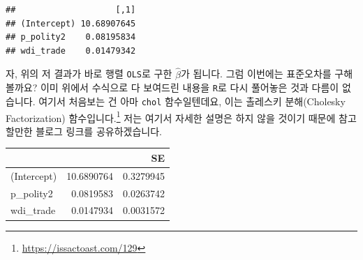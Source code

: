 \documentclass[
]{book}
\newenvironment{Shaded}{\begin{snugshade}}{\end{snugshade}}
\newcommand{\CommentTok}[1]{\textcolor[rgb]{0.56,0.35,0.01}{\textit{#1}}}
\newcommand{\DecValTok}[1]{\textcolor[rgb]{0.00,0.00,0.81}{#1}}
\newcommand{\KeywordTok}[1]{\textcolor[rgb]{0.13,0.29,0.53}{\textbf{#1}}}
\newcommand{\NormalTok}[1]{#1}
\newcommand{\OperatorTok}[1]{\textcolor[rgb]{0.81,0.36,0.00}{\textbf{#1}}}
\newcommand{\StringTok}[1]{\textcolor[rgb]{0.31,0.60,0.02}{#1}}
\begin{document}
\begin{verbatim}
##                    [,1]
## (Intercept) 10.68907645
## p_polity2    0.08195834
## wdi_trade    0.01479342
\end{verbatim}

자, 위의 저 결과가 바로 행렬 \texttt{OLS}로 구한 \(\hat{\beta}\)가 됩니다. 그럼 이번에는 표준오차를 구해볼까요? 이미 위에서 수식으로 다 보여드린 내용을 \texttt{R}로 다시 풀어놓은 것과 다름이 없습니다. 여기서 처음보는 건 아마 \texttt{chol} 함수일텐데요, 이는 촐레스키 분해(Cholesky Factorization) 함수입니다.\footnote{\url{https://issactoast.com/129}} 저는 여기서 자세한 설명은 하지 않을 것이기 때문에 참고할만한 블로그 링크를 공유하겠습니다.

\begin{Shaded}
\end{Shaded}

\begin{tabular}{l|r|r}
\hline
  &  & SE\\
\hline
(Intercept) & 10.6890764 & 0.3279945\\
\hline
p\_polity2 & 0.0819583 & 0.0263742\\
\hline
wdi\_trade & 0.0147934 & 0.0031572\\
\hline
\end{tabular}

\begin{Shaded}
\end{Shaded}
\end{document}
